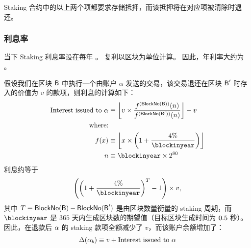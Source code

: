 Staking 合约中的以上两个项都要求存储抵押，而该抵押将在对应项被清除时退还。



\subsubsection{利息率}

当下 Staking 利息率设在每年 \interest。
复利以区块为单位计算。
因此，年利率大约为 \annualinterest。

假设我们在区块 $\textsf{B}$ 中执行一个由账户 $\alpha$ 发送的交易，该交易退还在区块 $\textsf{B}'$ 时存入的价值为 $v$ 的款项，则利息的计算如下：
\begin{align}
	\text{Interest issued to $\account$} 
	&\eqdef \left\lfloor v \times \frac{f^{(\blockno(\block))}(n)}{f^{(\blockno(\block'))}(n)} \right\rfloor- v \\ 
	\mbox{where:}& \\
	f(x) &\eqdef \left\lfloor x \times \left(1+\frac{\interest}{\blockinyear}\right)\right\rfloor \\
	n &\eqdef \blockinyear \times 2^{80}
\end{align}
利息约等于
\begin{align}
	\left(\left(1+\frac{\interest}{\blockinyear}\right)^T-1\right)\times v, 
\end{align}
其中  $T\equiv\mathsf{BlockNo}(\textsf{B}) - \mathsf{BlockNo}(\textsf{B}')$ 是由区块数量衡量的 staking 周期，而 $\blockinyear$ 是 $365$ 天内生成区块数的期望值（目标区块生成时间为 $0.5$ 秒）。
% 
因此，在退款后 $\mathbf{\alpha}$ 的 staking 款项全额减少了 $v$，而该账户余额增加了：
\begin{align}
	\Delta(\mathbf{\alpha}_b) \equiv v + \text{Interest issued to $\mathbf{\alpha}$} 
\end{align}

